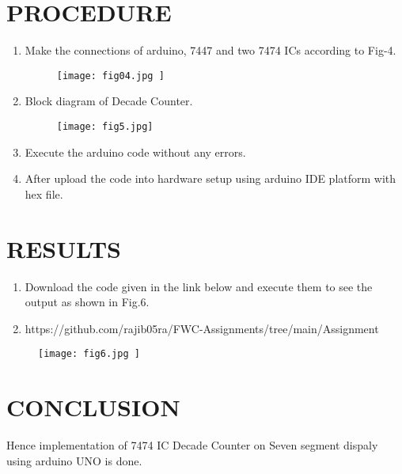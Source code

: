\documentclass[conference]{IEEEtran}
\begin{document}
\section{PROCEDURE}


\begin{enumerate}

\item Make the connections of arduino, 7447 and two 7474 ICs according to Fig-4.
	\begin{figure}[h] 
	\centering 
	\texttt{[image: fig04.jpg     ]}
	\caption{\label{fig-4:Gates}}    
\end{figure}

\item Block diagram of Decade Counter.

\begin{figure}[h]                           
\centering                                 
\texttt{[image: fig5.jpg]}                                           
\caption{\label{fig-5:Gates}}               
\end{figure}


	
\item Execute the arduino code without any errors.
\item After upload the code into hardware setup using arduino IDE platform with hex file.
 \end{enumerate}

\section{RESULTS}
 \begin{enumerate}
	 \item Download the code given in the link below and execute them to see the output as shown in Fig.6. 
	 \item https://github.com/rajib05ra/FWC-Assignments/tree/main/Assignment%
 \end{enumerate}
		 \begin{figure}[h] 
	\centering 
			 \texttt{[image: fig6.jpg    ]}
	\caption{\label{fig-6:Gates}}    
\end{figure}
\section{CONCLUSION}
Hence implementation of 7474 IC Decade Counter on Seven segment dispaly using arduino UNO is done.
\end{document}
